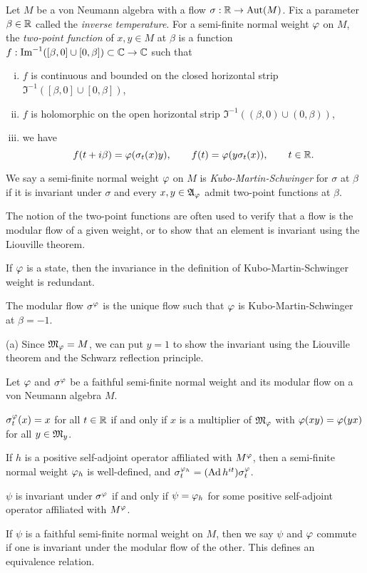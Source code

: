 \documentclass{../../large}
\begin{document}
\begin{prb}
Let $M$ be a von Neumann algebra with a flow $\sigma:\mathbb{R}\to\operatorname{Aut}(M)$.
Fix a parameter $\beta\in\mathbb{R}$ called the \emph{inverse temperature}.
For a semi-finite normal weight $\varphi$ on $M$, the \emph{two-point function} of $x,y\in M$ at $\beta$ is a function $f:\operatorname{Im}^{-1}([\beta,0]\cup[0,\beta])\subset\mathbb{C}\to\mathbb{C}$ such that
\begin{enumerate}[(i)]
\item $f$ is continuous and bounded on the closed horizontal strip $\Im^{-1}([\beta,0]\cup[0,\beta])$,
\item $f$ is holomorphic on the open horizontal strip $\Im^{-1}((\beta,0)\cup(0,\beta))$,
\item we have
\[f(t+i\beta)=\varphi(\sigma_t(x)y),\qquad f(t)=\varphi(y\sigma_t(x)),\qquad t\in\mathbb{R}.\]
\end{enumerate}
We say a semi-finite normal weight $\varphi$ on $M$ is \emph{Kubo-Martin-Schwinger} for $\sigma$ at $\beta$ if it is invariant under $\sigma$ and every $x,y\in\mathfrak{A}_\varphi$ admit two-point functions at $\beta$.

The notion of the two-point functions are often used to verify that a flow is the modular flow of a given weight, or to show that an element is invariant using the Liouville theorem.
\begin{parts}
\item If $\varphi$ is a state, then the invariance in the definition of Kubo-Martin-Schwinger weight is redundant.
\item The modular flow $\sigma^\varphi$ is the unique flow such that $\varphi$ is Kubo-Martin-Schwinger at $\beta=-1$.
\item 
\end{parts}
\end{prb}
\begin{pf}
(a) Since $\mathfrak{M}_\varphi=M$, we can put $y=1$ to show the invariant using the Liouville theorem and the Schwarz reflection principle.


\end{pf}

\begin{prb}
Let $\varphi$ and $\sigma^\varphi$ be a faithful semi-finite normal weight and its modular flow on a von Neumann algebra $M$.
\begin{parts}
\item $\sigma^\varphi_t(x)=x$ for all $t\in\mathbb{R}$ if and only if $x$ is a multiplier of $\mathfrak{M}_\varphi$ with $\varphi(xy)=\varphi(yx)$ for all $y\in\mathfrak{M}_y$.
\item If $h$ is a positive self-adjoint operator affiliated with $M^\varphi$, then a semi-finite normal weight $\varphi_h$ is well-defined, and $\sigma^{\varphi_h}_t=(\operatorname{Ad} h^{it})\sigma^\varphi_t$.
\item $\psi$ is invariant under $\sigma^\varphi$ if and only if $\psi=\varphi_h$ for some positive self-adjoint operator affiliated with $M^\varphi$.
\item If $\psi$ is a faithful semi-finite normal weight on $M$, then we say $\psi$ and $\varphi$ commute if one is invariant under the modular flow of the other. This defines an equivalence relation.
\end{parts}
\end{prb}
\end{document}
